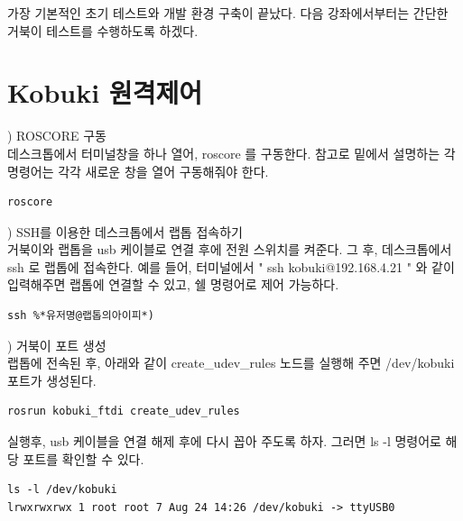 가장 기본적인 초기 테스트와 개발 환경 구축이 끝났다. 다음 강좌에서부터는 간단한 거북이 테스트를 수행하도록 하겠다.

\section{Kobuki 원격제어}

\setcounter{num}{0}

\vspace{\baselineskip}
\noindent{}
\thenum) ROSCORE 구동\\
데스크톱에서 터미널창을 하나 열어, roscore 를 구동한다. 참고로 밑에서 설명하는 각 명령어는 각각 새로운 창을 열어 구동해줘야 한다.

\begin{lstlisting}[language=ROS]
roscore
\end{lstlisting}

\vspace{\baselineskip}
\noindent{}
\thenum) SSH를 이용한 데스크톱에서 랩톱 접속하기\\
거북이와 랩톱을 usb 케이블로 연결 후에 전원 스위치를 켜준다. 그 후, 데스크톱에서 ssh 로 랩톱에 접속한다. 예를 들어, 터미널에서 " ssh kobuki@192.168.4.21 " 와 같이 입력해주면 랩톱에 연결할 수 있고, 쉘 명령어로 제어 가능하다.

\begin{lstlisting}[language=ROS]
ssh %*유저명@랩톱의아이피*)
\end{lstlisting}

\vspace{\baselineskip}
\noindent{}
\thenum) 거북이 포트 생성\\
랩톱에 전속된 후, 아래와 같이 create\_udev\_rules 노드를 실행해 주면 /dev/kobuki 포트가 생성된다. 

\begin{lstlisting}[language=ROS]
rosrun kobuki_ftdi create_udev_rules
\end{lstlisting}

실행후, usb 케이블을 연결 해제 후에 다시 꼽아 주도록 하자. 그러면 ls -l 명령어로 해당 포트를 확인할 수 있다.

\begin{lstlisting}[language=ROS]
ls -l /dev/kobuki
lrwxrwxrwx 1 root root 7 Aug 24 14:26 /dev/kobuki -> ttyUSB0
\end{lstlisting}

